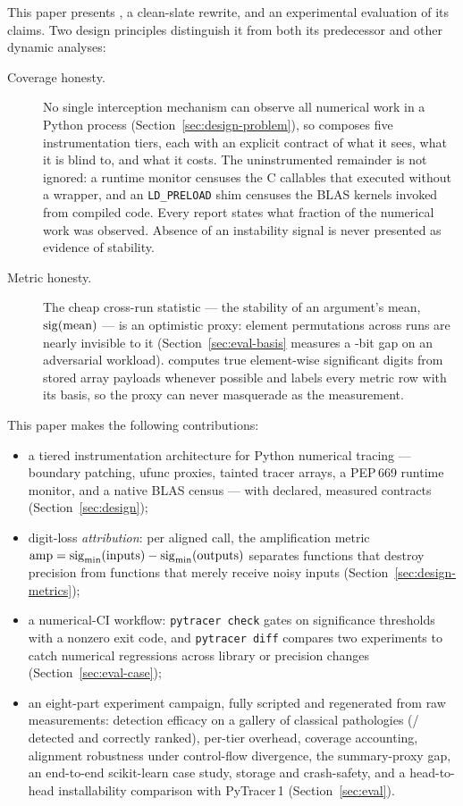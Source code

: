 This paper presents \pyt{}, a clean-slate rewrite, and an experimental
evaluation of its claims. Two design principles distinguish it from both
its predecessor and other dynamic analyses:

\begin{description}
\item[Coverage honesty.] No single interception mechanism can observe all
numerical work in a Python process (Section~\ref{sec:design-problem}), so
\pyt{} composes five instrumentation tiers, each with an explicit
contract of what it sees, what it is blind to, and what it costs. The
uninstrumented remainder is not ignored: a runtime monitor censuses the C
callables that executed without a wrapper, and an \texttt{LD\_PRELOAD}
shim censuses the BLAS kernels invoked from compiled code. Every report
states what fraction of the numerical work was observed. Absence of an
instability signal is never presented as evidence of stability.
\item[Metric honesty.] The cheap cross-run statistic --- the stability of
an argument's mean, $\operatorname{sig}(\mathrm{mean})$ --- is an optimistic proxy:
element permutations across runs are nearly invisible to it
(Section~\ref{sec:eval-basis} measures a \permOptimismBits{}-bit gap on an
adversarial workload). \pyt{} computes true element-wise significant
digits from stored array payloads whenever possible and labels every
metric row with its basis, so the proxy can never masquerade as the
measurement.
\end{description}

\noindent This paper makes the following contributions:
\begin{itemize}
\item a tiered instrumentation architecture for Python numerical tracing
  --- boundary patching, ufunc proxies, tainted tracer arrays, a
  PEP\,669 runtime monitor, and a native BLAS census --- with declared,
  measured contracts (Section~\ref{sec:design});
\item digit-loss \emph{attribution}: per aligned call, the amplification
  metric $\mathrm{amp} = \operatorname{sig}_{\min}(\text{inputs}) -
  \operatorname{sig}_{\min}(\text{outputs})$ separates functions that destroy precision
  from functions that merely receive noisy inputs
  (Section~\ref{sec:design-metrics});
\item a numerical-CI workflow: \texttt{pytracer check} gates on
  significance thresholds with a nonzero exit code, and \texttt{pytracer
  diff} compares two experiments to catch numerical regressions across
  library or precision changes (Section~\ref{sec:eval-case});
\item an eight-part experiment campaign, fully scripted and regenerated
  from raw measurements: detection efficacy on a gallery of
  \nPathologies{} classical pathologies (\nDetected{}/\nPathologies{}
  detected and correctly ranked), per-tier overhead, coverage accounting,
  alignment robustness under control-flow divergence, the summary-proxy
  gap, an end-to-end scikit-learn case study, storage and crash-safety,
  and a head-to-head installability comparison with PyTracer\,1
  (Section~\ref{sec:eval}).
\end{itemize}

